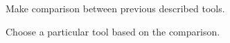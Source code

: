 Make comparison between previous described tools.

Choose a particular tool based on the comparison.